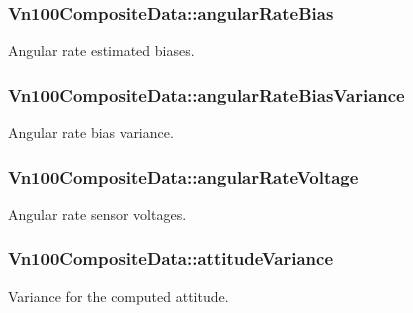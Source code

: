 \subsubsection[{\texorpdfstring{angular\+Rate\+Bias}{angularRateBias}}]{ Vn100\+Composite\+Data\+::angular\+Rate\+Bias}\hypertarget{structVn100CompositeData_a5c173cdabde185645cf09a46e63b6956}{}\label{structVn100CompositeData_a5c173cdabde185645cf09a46e63b6956}
Angular rate estimated biases. 
\subsubsection[{\texorpdfstring{angular\+Rate\+Bias\+Variance}{angularRateBiasVariance}}]{ Vn100\+Composite\+Data\+::angular\+Rate\+Bias\+Variance}\hypertarget{structVn100CompositeData_ae93b1ddac5649602fc7623d8f9437d32}{}\label{structVn100CompositeData_ae93b1ddac5649602fc7623d8f9437d32}
Angular rate bias variance. 
\subsubsection[{\texorpdfstring{angular\+Rate\+Voltage}{angularRateVoltage}}]{ Vn100\+Composite\+Data\+::angular\+Rate\+Voltage}\hypertarget{structVn100CompositeData_afc2351d2854bf2ff0711bc4b939d0d8b}{}\label{structVn100CompositeData_afc2351d2854bf2ff0711bc4b939d0d8b}
Angular rate sensor voltages. 
\subsubsection[{\texorpdfstring{attitude\+Variance}{attitudeVariance}}]{ Vn100\+Composite\+Data\+::attitude\+Variance}\hypertarget{structVn100CompositeData_a582aa6c6eb2a97ec5f245e4f6b792b0e}{}\label{structVn100CompositeData_a582aa6c6eb2a97ec5f245e4f6b792b0e}
Variance for the computed attitude. 
